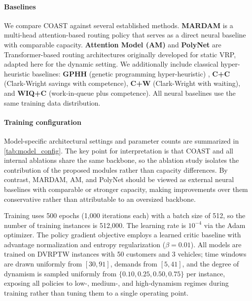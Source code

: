 \documentclass[conference]{IEEEtran}
\begin{document}
\paragraph{Baselines}
We compare COAST against several established methods. \textbf{MARDAM} is a multi-head attention-based routing policy that serves as a direct neural baseline with comparable capacity. \textbf{Attention Model (AM)} \cite{kool2018attention} and \textbf{PolyNet} \cite{hottung2025polynet} are Transformer-based routing architectures originally developed for static VRP, adapted here for the dynamic setting. We additionally include classical hyper-heuristic baselines: \textbf{GPHH} (genetic programming hyper-heuristic) \cite{TAM2026114234}, \textbf{C+C} (Clark-Wright savings with competence), \textbf{C+W} (Clark-Wright with waiting), and \textbf{WIQ+C} (work-in-queue plus competence). All neural baselines use the same training data distribution.

\paragraph{Training configuration}
Model-specific architectural settings and parameter counts are summarized in \autoref{tab:model_config}. The key point for interpretation is that COAST and all internal ablations share the same backbone, so the ablation study isolates the contribution of the proposed modules rather than capacity differences. By contrast, MARDAM, AM, and PolyNet should be viewed as external neural baselines with comparable or stronger capacity, making improvements over them conservative rather than attributable to an oversized backbone.

Training uses 500 epochs (1,000 iterations each) with a batch size of 512, so the number of training instances is 512,000. The learning rate is $10^{-4}$ via the Adam optimizer. The policy gradient objective employs a learned critic baseline with advantage normalization and entropy regularization ($\beta = 0.01$). All models are trained on DVRPTW instances with 50 customers and 3 vehicles; time windows are drawn uniformly from $[30, 91]$, demands from $[5, 41]$, and the degree of dynamism is sampled uniformly from $\{0.10, 0.25, 0.50, 0.75\}$ per instance, exposing all policies to low-, medium-, and high-dynamism regimes during training rather than tuning them to a single operating point.
\end{document}
